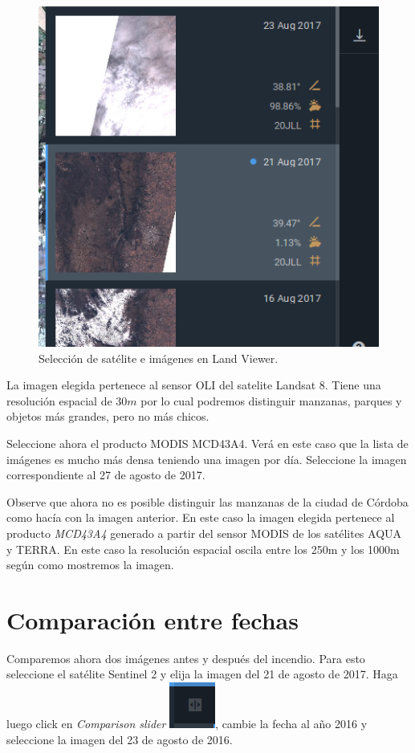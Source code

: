 \documentclass[a4paper,12pt]{book}
\begin{document}
\begin{figure}[h!]
\begin{minipage}{.425\linewidth}
  \includegraphics[width=\linewidth]{fig:imagen1.png}
\end{minipage}
\caption{Selección de satélite e imágenes en Land Viewer.}
\label{fig:scene}
\end{figure}

La imagen elegida pertenece al sensor OLI del satelite Landsat 8. Tiene una resolución espacial de $30m$ por lo cual podremos distinguir manzanas, parques y objetos más grandes, pero no más chicos.

Seleccione ahora el producto MODIS MCD43A4. Verá en este caso que la lista de imágenes es mucho más densa teniendo una imagen por día. Seleccione la imagen correspondiente al 27 de agosto de 2017.

Observe que ahora no es posible distinguir las manzanas de la ciudad de Córdoba como hacía con la imagen anterior. En este caso la imagen elegida pertenece al producto \emph{MCD43A4} generado a partir del sensor MODIS de los satélites AQUA y TERRA. En este caso la resolución espacial oscila entre los 250m y los 1000m según como mostremos la imagen.

\section{Comparación entre fechas}
Comparemos ahora dos imágenes antes y después del incendio. Para esto seleccione el satélite Sentinel 2 y elija la imagen del 21 de agosto de 2017. Haga luego click en \emph{Comparison slider} \includegraphics[scale=0.2]{in:LR.png}, cambie la fecha al año 2016 y seleccione la imagen del 23 de agosto de 2016.
\end{document}
